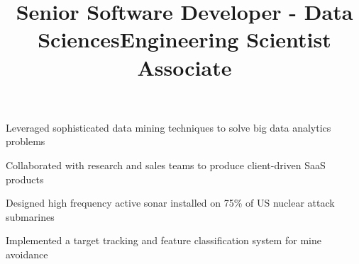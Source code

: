 \documentclass[12pt, tweaklist, line]{res}
\let\tempone\itemize
\let\temptwo\enditemize
\renewenvironment{itemize}{\tempone\vspace{-.15in}\setlength{\topsep}{0pt}\setlength{\itemsep}{3pt}\vspace{-.15in}}{\temptwo}
\def\Cplusplus{C++}
\begin{document}
\begin{resume}
\title{Senior Software Developer - Data Sciences}
\begin{position}
\begin{itemize}
\item Leveraged sophisticated data mining techniques to solve big data analytics problems
\item Collaborated with research and sales teams to produce client-driven SaaS products
\end{itemize}
\end{position}

\title{Engineering Scientist Associate} %
\begin{position}
\begin{itemize}
\item Designed high frequency active sonar installed on 75\% of US nuclear attack submarines
\item Implemented a target tracking and feature classification system for mine avoidance
\end{itemize}
\end{position}


\end{resume}
\end{document}
